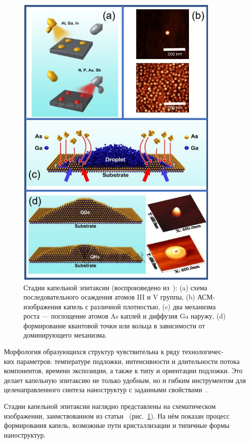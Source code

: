 \documentclass[14pt,oneside]{extarticle}
\begin{document}
\begin{figure}[H]
    \begin{center}
        \includegraphics[width=10cm]{images/gurioli_fig1.png}
        \caption{\label{fig:gurioli1}
            Стадии капельной эпитаксии (воспроизведено из~\cite{gurioli2021}): (a) схема последовательного осаждения атомов III и V группы, (b) АСМ-изображения капель с различной плотностью, (c) два механизма роста — поглощение атомов As каплей и диффузия Ga наружу, (d) формирование квантовой точки или кольца в зависимости от доминирующего механизма.}
    \end{center}
\end{figure}

Морфология обра\-зу\-ю\-щих\-ся струк\-тур чув\-стви\-тель\-на к ряду технологичес-\\ 
ких параметров: температуре подложки, интенсивности и длительности потока компонентов, времени экспозиции, а также к типу и ориентации подложки. Это делает капельную эпитаксию не только удобным, но и гибким инструментом для целенаправленного синтеза наноструктур с заданными свойствами~\cite{sibirmovskiy2014}.

Стадии капельной эпитаксии наглядно представлены на схематическом \\ 
изображении, заимствованном из статьи~\cite{gurioli2021} (рис.~\ref{fig:gurioli1}). На нём показан процесс формирования капель, возможные пути кристаллизации и типичные формы наноструктур.
\end{document}
